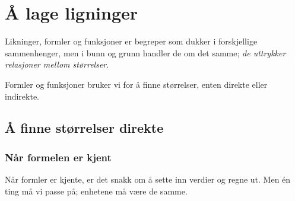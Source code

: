



\section{Å lage ligninger}
Likninger, formler og funksjoner er begreper som dukker i forskjellige sammenhenger, men i bunn og grunn handler de om det samme; \textsl{de uttrykker relasjoner mellom størrelser}.\vsk

Formler og funksjoner bruker vi for å finne størrelser, enten direkte eller indirekte.

\subsection{Å finne størrelser direkte}
\subsubsection{Når formelen er kjent}
Når formler er kjente, er det snakk om å sette inn verdier og regne ut. Men én ting må vi passe på; enhetene må være de samme.\regv


